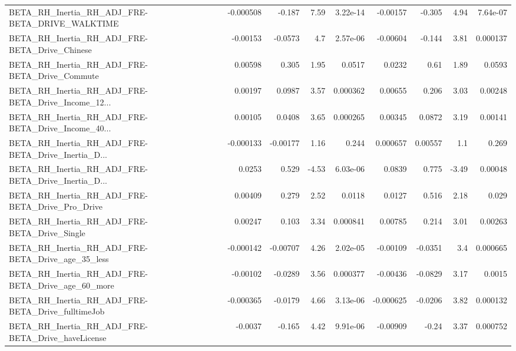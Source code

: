 \begin{tabular}{lrrrrrrrr}
BETA\_RH\_Inertia\_RH\_ADJ\_FRE-BETA\_DRIVE\_WALKTIME     &   -0.000508 &       -0.187 &     7.59 & 3.22e-14 &   -0.00157 &      -0.305 &         4.94 &      7.64e-07 \\
BETA\_RH\_Inertia\_RH\_ADJ\_FRE-BETA\_Drive\_Chinese      &    -0.00153 &      -0.0573 &      4.7 & 2.57e-06 &   -0.00604 &      -0.144 &         3.81 &      0.000137 \\
BETA\_RH\_Inertia\_RH\_ADJ\_FRE-BETA\_Drive\_Commute      &     0.00598 &        0.305 &     1.95 &   0.0517 &     0.0232 &        0.61 &         1.89 &        0.0593 \\
BETA\_RH\_Inertia\_RH\_ADJ\_FRE-BETA\_Drive\_Income\_12... &     0.00197 &       0.0987 &     3.57 & 0.000362 &    0.00655 &       0.206 &         3.03 &       0.00248 \\
BETA\_RH\_Inertia\_RH\_ADJ\_FRE-BETA\_Drive\_Income\_40... &     0.00105 &       0.0408 &     3.65 & 0.000265 &    0.00345 &      0.0872 &         3.19 &       0.00141 \\
BETA\_RH\_Inertia\_RH\_ADJ\_FRE-BETA\_Drive\_Inertia\_D... &   -0.000133 &     -0.00177 &     1.16 &    0.244 &   0.000657 &     0.00557 &          1.1 &         0.269 \\
BETA\_RH\_Inertia\_RH\_ADJ\_FRE-BETA\_Drive\_Inertia\_D... &      0.0253 &        0.529 &    -4.53 & 6.03e-06 &     0.0839 &       0.775 &        -3.49 &       0.00048 \\
BETA\_RH\_Inertia\_RH\_ADJ\_FRE-BETA\_Drive\_Pro\_Drive    &     0.00409 &        0.279 &     2.52 &   0.0118 &     0.0127 &       0.516 &         2.18 &         0.029 \\
BETA\_RH\_Inertia\_RH\_ADJ\_FRE-BETA\_Drive\_Single       &     0.00247 &        0.103 &     3.34 & 0.000841 &    0.00785 &       0.214 &         3.01 &       0.00263 \\
BETA\_RH\_Inertia\_RH\_ADJ\_FRE-BETA\_Drive\_age\_35\_less  &   -0.000142 &     -0.00707 &     4.26 & 2.02e-05 &   -0.00109 &     -0.0351 &          3.4 &      0.000665 \\
BETA\_RH\_Inertia\_RH\_ADJ\_FRE-BETA\_Drive\_age\_60\_more  &    -0.00102 &      -0.0289 &     3.56 & 0.000377 &   -0.00436 &     -0.0829 &         3.17 &        0.0015 \\
BETA\_RH\_Inertia\_RH\_ADJ\_FRE-BETA\_Drive\_fulltimeJob  &   -0.000365 &      -0.0179 &     4.66 & 3.13e-06 &  -0.000625 &     -0.0206 &         3.82 &      0.000132 \\
BETA\_RH\_Inertia\_RH\_ADJ\_FRE-BETA\_Drive\_haveLicense  &     -0.0037 &       -0.165 &     4.42 & 9.91e-06 &   -0.00909 &       -0.24 &         3.37 &      0.000752 \\

\end{tabular}
